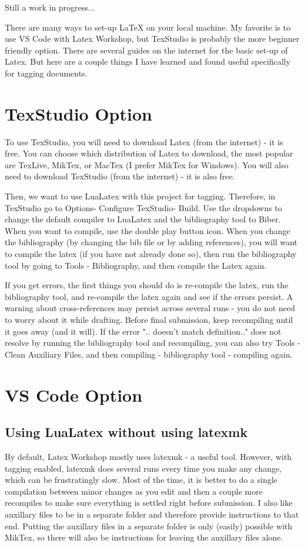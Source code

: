 \documentclass{article}
\begin{document}
Still a work in progress...

There are many ways to set-up LaTeX on your local machine.
My favorite is to use VS Code with Latex Workshop, but TexStudio is probably the more beginner friendly option.
There are several guides on the internet for the basic set-up of Latex.
But here are a couple things I have learned and found useful specifically for tagging documents.

\section{TexStudio Option}
To use TexStudio, you will need to download Latex (from the internet) - it is free. You can choose which distribution of Latex to download, the most popular are TexLive, MikTex, or MacTex (I prefer MikTex for Windows).
You will also need to download TexStudio (from the internet) - it is also free.

Then, we want to use LuaLatex with this project for tagging. Therefore, in TexStudio go to Options- Configure TexStudio- Build. Use the dropdowns to change the default compiler to LuaLatex and the bibliography tool to Biber.
When you want to compile, use the double play button icon. When you change the bibliography (by changing the bib file or by adding references), you will want to compile the latex (if you have not already done so), then run the bibliography tool by going to Tools - Bibliography, and then compile the Latex again.

If you get errors, the first things you should do is re-compile the latex, run the bibliography tool, and re-compile the latex again and see if the errors persist.
A warning about cross-references may persist across several runs - you do not need to worry about it while drafting. Before final submission, keep recompiling until it goes away (and it will).
If the error ".. doesn't match definition.." does not resolve by running the bibliography tool and recompiling, you can also try Tools - Clean Auxiliary Files, and then compiling - bibliography tool - compiling again.
\section{VS Code Option}
\subsection{Using LuaLatex without using latexmk}
By default, Latex Workshop mostly uses latexmk - a useful tool. However, with tagging enabled, latexmk does several runs every time you make any change, which can be frustratingly slow.
Most of the time, it is better to do a single compilation between minor changes as you edit and then a couple more recompiles to make sure everything is settled right before submission.
I also like auxillary files to be in a separate folder and therefore provide instructions to that end. Putting the auxillary files in a separate folder is only (easily) possible with MikTex, so there will also be instructions for leaving the auxillary files alone.
\end{document}
